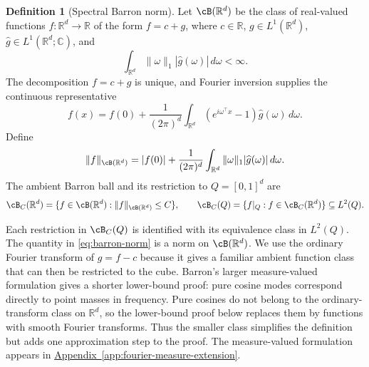 \documentclass[11pt,twoside]{article}
\newcommand{\appendixref}[1]{\hyperref[#1]{Appendix~\ref*{#1}}}
\newcommand{\R}{\mathbb R}
\theoremstyle{definition}
\newtheorem{definition}[theorem]{Definition}
\theoremstyle{remark}
\begin{document}
\begin{definition}[Spectral Barron norm]
\label{def:spectral-barron-norm}
Let \(\cB(\R^d)\) be the class of real-valued functions
\(f:\R^d\to\R\) of the form \(f=c+g\), where \(c\in\R\),
\(g\in L^1(\R^d)\), \(\widehat g\in L^1(\R^d;\mathbb C)\), and
\begin{equation}
 \int_{\R^d}\|\omega\|_1|\widehat g(\omega)|\,d\omega<\infty.
 \label{eq:barron-fourier-moment}
\end{equation}
The decomposition \(f=c+g\) is unique, and Fourier inversion supplies the
continuous representative
\begin{equation}
 f(x)=f(0)+\frac1{(2\pi)^d}\int_{\R^d}
 (e^{i\omega^\top x}-1)\widehat g(\omega)\,d\omega.
 \label{eq:barron-density-representation}
\end{equation}
Define
\begin{equation}
 \|f\|_{\cB(\R^d)}
 =|f(0)|+\frac1{(2\pi)^d}\int_{\R^d}
 \|\omega\|_1|\widehat g(\omega)|\,d\omega.
 \label{eq:barron-norm}
\end{equation}
The ambient Barron ball and its restriction to \(Q=[0,1]^d\) are
\begin{equation}
 \cB_C(\R^d)=\{f\in\cB(\R^d):\|f\|_{\cB(\R^d)}\leq C\},
 \qquad
 \cB_C(Q)=\{f|_Q:f\in\cB_C(\R^d)\}\subseteq L^2(Q).
 \label{eq:barron-class}
\end{equation}
\end{definition}
Each restriction in \(\cB_C(Q)\) is identified with its equivalence class in
\(L^2(Q)\). The quantity in \cref{eq:barron-norm} is a norm on
\(\cB(\R^d)\). We use the ordinary Fourier transform of \(g=f-c\) because it
gives a familiar ambient function class that can then be restricted to the
cube. Barron's larger measure-valued formulation gives a shorter lower-bound
proof: pure cosine modes correspond directly to point masses in frequency.
Pure cosines do not belong to the ordinary-transform class on \(\R^d\), so the
lower-bound proof below replaces them by functions with smooth Fourier
transforms. Thus the smaller class simplifies the definition but adds one
approximation step to the proof. The measure-valued formulation appears in
\appendixref{app:fourier-measure-extension}.%
\end{document}
